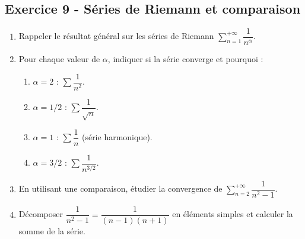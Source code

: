 \documentclass[12pt,a4paper]{article}
\begin{document}
\subsection*{Exercice 9 - Séries de Riemann et comparaison \niveau{\facile}}

\begin{boiteexercice}
\begin{enumerate}
  \item Rappeler le résultat général sur les séries de Riemann $\sum_{n=1}^{+\infty}\dfrac{1}{n^\alpha}$.
  \item Pour chaque valeur de $\alpha$, indiquer si la série converge et pourquoi :
  \begin{enumerate}[label=(\alph*)]
    \item $\alpha = 2$ : $\sum\dfrac{1}{n^2}$.
    \item $\alpha = 1/2$ : $\sum\dfrac{1}{\sqrt{n}}$.
    \item $\alpha = 1$ : $\sum\dfrac{1}{n}$ (série harmonique).
    \item $\alpha = 3/2$ : $\sum\dfrac{1}{n^{3/2}}$.
  \end{enumerate}
  \item En utilisant une comparaison, étudier la convergence de $\sum_{n=2}^{+\infty}\dfrac{1}{n^2-1}$.
  \item Décomposer $\dfrac{1}{n^2-1} = \dfrac{1}{(n-1)(n+1)}$ en éléments simples et calculer la somme de la série.
\end{enumerate}
\end{boiteexercice}
\end{document}
